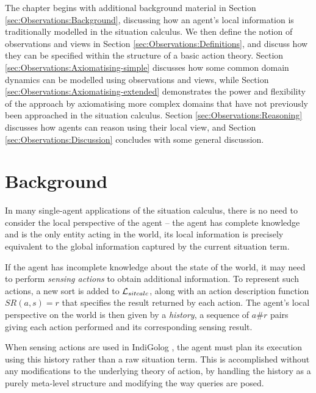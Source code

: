 The chapter begins with additional background material in Section
\ref{sec:Observations:Background}, discussing how an agent's local
information is traditionally modelled in the situation calculus. We
then define the notion of observations and views in Section \ref{sec:Observations:Definitions},
and discuss how they can be specified within the structure of a basic
action theory. Section \ref{sec:Observations:Axiomatising-simple}
discusses how some common domain dynamics can be modelled using observations
and views, while Section \ref{sec:Observations:Axiomatising-extended}
demonstrates the power and flexibility of the approach by axiomatising
more complex domains that have not previously been approached in the
situation calculus. Section \ref{sec:Observations:Reasoning} discusses
how agents can reason using their local view, and Section \ref{sec:Observations:Discussion}
concludes with some general discussion.


\section{Background\label{sec:Observations:Background}}

In many single-agent applications of the situation calculus, there
is no need to consider the local perspective of the agent -- the agent
has complete knowledge and is the only entity acting in the world,
its local information is precisely equivalent to the global information
captured by the current situation term.

If the agent has incomplete knowledge about the state of the world,
it may need to perform \emph{sensing actions} to obtain additional
information. To represent such actions, a new sort is
added to $\mathcal{L}_{sitcalc}$, along with an action description function $SR(a,s)=r$
that specifies the result returned by each action. The agent's local
perspective on the world is then given by a \emph{history}, a sequence
of $a\#r$ pairs giving each action performed and its corresponding
sensing result.

When sensing actions are used in IndiGolog \citep{giacomo99indigolog},
the agent must plan its execution using this history rather than a
raw situation term. This is accomplished without any modifications
to the underlying theory of action, by handling the history as a purely
meta-level structure and modifying the way queries are posed.


